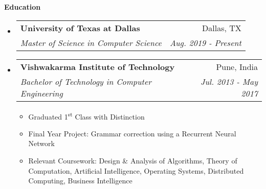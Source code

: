 \documentclass[letterpaper,12pt]{article}
\makeatletter
\newcommand{\ts}{\textsuperscript}
\newcommand{\resitem}[1]{\item #1 \vspace{-2pt}}
\newcommand{\resheading}[1]{{\large \colorbox{mygrey}{\begin{minipage}{\textwidth}{\textbf{#1 \vphantom{p\^{E}}}}\end{minipage}}}}
\newcommand{\ressubheading}[4]{
    \begin{tabular*}{7.0in}{l@{\extracolsep{\fill}}r}
      \textbf{#1} & #2 \\
      \textit{#3} & \textit{#4} \\
    \end{tabular*}\vspace{-6pt}}
\newif\ifhighschool
\makeatother
\begin{document}
  \resheading{Education}
  \begin{itemize}
  \item
    \ressubheading{University of Texas at Dallas}{Dallas, TX}{Master of Science in Computer Science}{Aug. 2019 - Present}
    \begin{itemize}
    \end{itemize}
  \item
    \ressubheading{Vishwakarma Institute of Technology}{Pune, India}{Bachelor of Technology in Computer Engineering}{Jul. 2013 - May 2017}
    \begin{itemize}
      \resitem {Graduated 1\ts{st} Class with Distinction}
      \resitem {Final Year Project: Grammar correction using a Recurrent Neural Network}
      \resitem{Relevant Coursework: Design \& Analysis of Algorithms, Theory of Computation, Artificial Intelligence, Operating Systems, Distributed Computing, Business Intelligence}
    \end{itemize}
    \ifhighschool	
  \item
    \ressubheading{Delhi Public School}{Pune, India}{12th Grade CBSE}{May 2013}
    \begin{itemize}
      \resitem{Percentage: 76.4\%}
    \end{itemize}
  \item
    \ressubheading{Delhi Public School}{Pune, India}{10th Grade CBSE}{May 2011}
    \begin{itemize}
      \resitem{CGPA: 8.6}
    \end{itemize}
    \fi
  \end{itemize}
  
  \pagebreak
  
\end{document}

